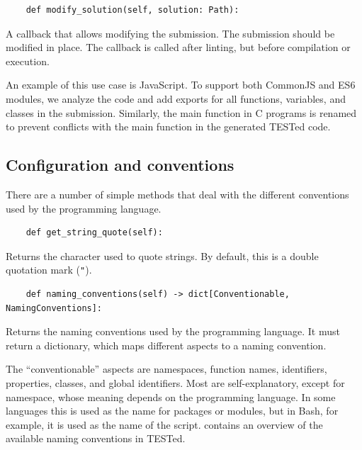 \documentclass[../main]{subfiles}
\begin{document}
\begin{verbatim}
    def modify_solution(self, solution: Path):
\end{verbatim}

A callback that allows modifying the submission.
The submission should be modified in place.
The callback is called after linting, but before compilation or execution.

An example of this use case is JavaScript.
To support both CommonJS and ES6 modules, we analyze the code and add exports for all functions, variables, and classes in the submission.
Similarly, the main function in C programs is renamed to prevent conflicts with the main function in the generated TESTed code.

\subsection{Configuration and conventions}\label{subsec:configuration-and-conventions}

There are a number of simple methods that deal with the different conventions used by the programming language.

\begin{verbatim}
    def get_string_quote(self):
\end{verbatim}

Returns the character used to quote strings.
By default, this is a double quotation mark (\texttt{"}).

\begin{verbatim}
    def naming_conventions(self) -> dict[Conventionable, NamingConventions]:
\end{verbatim}

Returns the naming conventions used by the programming language.
It must return a dictionary, which maps different aspects to a naming convention.

The ``conventionable'' aspects are namespaces, function names, identifiers, properties, classes, and global identifiers.
Most are self-explanatory, except for namespace, whose meaning depends on the programming language.
In some languages this is used as the name for packages or modules, but in Bash, for example, it is used as the name of the script.
 contains an overview of the available naming conventions in TESTed.
\end{document}
